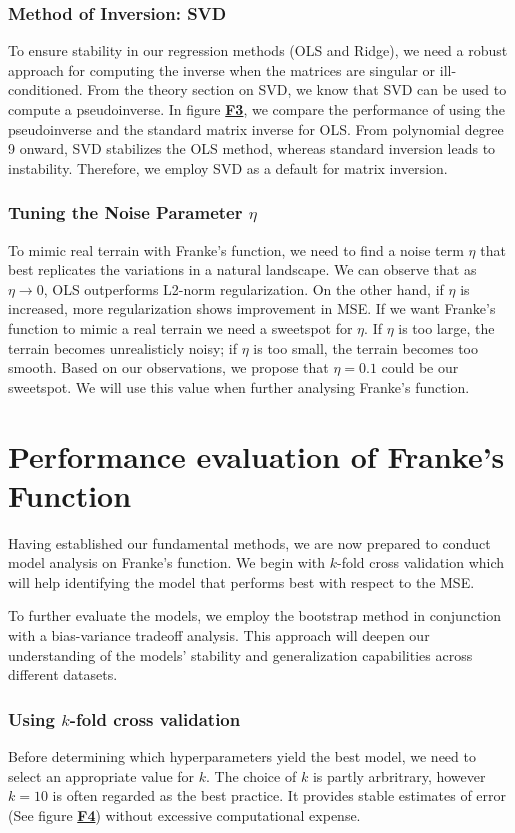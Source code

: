 \documentclass{article}
\begin{document}
\begin{multicols}{2}
\subsubsection*{Method of Inversion: SVD} 
To ensure stability in our regression methods (OLS and Ridge), we need a robust approach for computing the inverse when the matrices are singular or ill-conditioned. From the theory section on 
SVD, we know that SVD can be used to compute a pseudoinverse. In figure \hyperref[fig:F3]{\textbf{F3}}, we compare the performance of using the pseudoinverse and the standard matrix inverse for OLS. From polynomial degree 9 onward, SVD stabilizes the OLS method, whereas standard inversion leads to instability. Therefore, we employ SVD as a default for matrix inversion. 

\subsubsection*{Tuning the Noise Parameter $\eta$} To mimic real terrain with Franke's function, we need to find a noise term $\eta$ that best replicates the variations in a natural landscape. We can observe that as $\eta \rightarrow 0$, OLS outperforms L2-norm regularization. On the other hand, if $\eta$ is increased, more regularization shows improvement in MSE. If we want Franke's function to mimic a real terrain we need a sweetspot for $\eta$. If $\eta$ is too large, the terrain becomes unrealisticly noisy; if $\eta$ is too small, the terrain becomes too smooth. Based on our observations, we propose that $\eta = 0.1$ could be our sweetspot. We will use this value when further analysing Franke's function. 

\section*{Performance evaluation of Franke’s Function}
Having established our fundamental methods, we are now prepared to conduct model analysis on Franke's function. We begin with $k$-fold cross validation which will help identifying the model that performs best with respect to the MSE.

To further evaluate the models, we employ the bootstrap method in conjunction with a bias-variance tradeoff analysis. This approach will deepen our understanding of the models' stability and generalization capabilities across different datasets.

\subsubsection*{Using $k$-fold cross validation}
Before determining which hyperparameters yield the best model, we need to select an appropriate value for $k$.  
The choice of $k$ is partly arbritrary, however $k = 10$ is often regarded as the best practice. It provides stable estimates of error (See figure \hyperref[fig:F4]{\textbf{F4}}) without excessive computational expense. %


\end{multicols}
\end{document}
